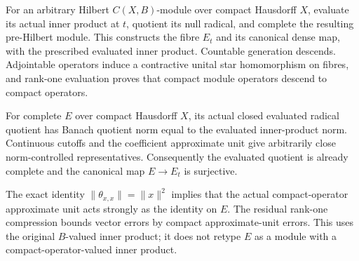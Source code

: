 \begin{proposition}\label{prop:arbitrary-hilbert-module-fibres}
\leanok
For an arbitrary Hilbert $C(X,B)$-module over compact Hausdorff $X$,
evaluate its actual inner product at $t$, quotient its null radical,
and complete the resulting pre-Hilbert module. This constructs the fibre
$E_t$ and its canonical dense map, with the prescribed evaluated inner
product. Countable generation descends. Adjointable operators induce a
contractive unital star homomorphism on fibres, and rank-one evaluation
proves that compact module operators descend to compact operators.
\end{proposition}

\begin{proposition}\label{prop:arbitrary-module-fibre-quotient-norm}
\leanok
For complete $E$ over compact Hausdorff $X$, its actual closed evaluated
radical quotient has Banach quotient norm equal to the evaluated inner-product
norm. Continuous cutoffs and the coefficient approximate unit give arbitrarily
close norm-controlled representatives. Consequently the evaluated quotient
is already complete and the canonical map $E\to E_t$ is surjective.
\end{proposition}


\begin{proposition}\label{prop:compact-au-acts-strongly}
\leanok
The exact identity $\|\theta_{x,x}\|=\|x\|^2$ implies that the actual
compact-operator approximate unit acts strongly as the identity on $E$.
The residual rank-one compression bounds vector errors by compact
approximate-unit errors. This uses the original $B$-valued inner product;
it does not retype $E$ as a module with a compact-operator-valued inner product.
\end{proposition}

